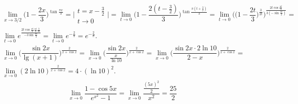 \documentclass[12pt]{article}
\begin{document}
$$
\begin{array}{l}
\lim\limits_{x\rightarrow3/2}\biggl(1-\dfrac{2x}{3}\biggr)^{\tan{\frac{\pi x}{3}}} = 
\biggl|
\begin{array}{l}
t = x-\frac{3}{2} \\ t\rightarrow0
\end{array}
\biggr| =
\lim\limits_{t\rightarrow0}\biggl(1-\dfrac{2(t-\frac{3}{2})}{3}\biggr)^{\tan{\frac{\pi (t+\frac{3}{2})}{3}}} =
\lim\limits_{t\rightarrow0}\biggl(\biggl(1-\dfrac{2t}{3}\biggr)^{\frac{3}{2t}}\biggr)^{\frac{2t\cos{\frac{\pi t}{3}}}{3(-\sin{\frac{\pi t}{3}})}} = \\ 
\lim\limits_{t\rightarrow0}e^{\frac{2t\cos{\frac{\pi t}{3}}\frac{\pi t}{3}\frac{3}{\pi t}}{-3\sin{\frac{\pi t}{3}}}} = \lim\limits_{t\rightarrow0}e^{-\frac{2}{\pi}} = e^{-\frac{2}{\pi}}.
\end{array}
$$
$$
\begin{array}{l}
\lim\limits_{x\rightarrow0}\biggl(\dfrac{\sin{2x}}{\lg(x+1)}\biggr)^{\frac{2}{x+\cos{x}}} = 
\lim\limits_{x\rightarrow0}\biggl(\dfrac{\sin{2x}}{\frac{x}{\ln{10}}}\biggr)^{\frac{2}{x+\cos{x}}} =
\lim\limits_{x\rightarrow0}\biggl(\dfrac{\sin{2x}\cdot2\ln{10}}{2-x}\biggr)^{\frac{2}{x+\cos{x}}} = \\
\lim\limits_{x\rightarrow0}(2\ln{10})^{\frac{2}{x+\cos{x}}} = 4\cdot(\ln{10})^2.
\end{array}
$$
$$
\begin{array}{l}
\lim\limits_{x\rightarrow0}\dfrac{1-\cos{5x}}{e^{x^2}-1} = \lim\limits_{x\rightarrow0}\dfrac{\frac{(5x)^2}{2}}{x^2} = \dfrac{25}{2}
\end{array}
$$
\newpage
\end{document}
